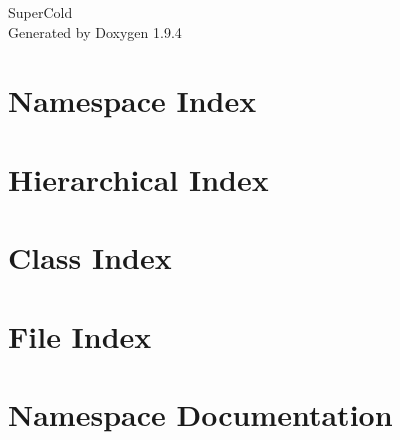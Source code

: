 \documentclass[twoside]{book}
\newcommand{\+}{\discretionary{\mbox{\scriptsize$\hookleftarrow$}}{}{}}
\newcommand{\clearemptydoublepage}{%
    \newpage{\pagestyle{empty}\cleardoublepage}%
  }
\begin{document}
  \raggedbottom
    \hypersetup{pageanchor=false,
                bookmarksnumbered=true,
                pdfencoding=unicode
               }
  \begin{titlepage}
  \vspace*{7cm}
  \begin{center}%
  {\Large Super\+Cold}\\
  \vspace*{1cm}
  {\large Generated by Doxygen 1.9.4}\\
  \end{center}
  \end{titlepage}
  \clearemptydoublepage
  \tableofcontents
  \clearemptydoublepage
  \hypersetup{pageanchor=true}
\chapter{Namespace Index}

\chapter{Hierarchical Index}

\chapter{Class Index}

\chapter{File Index}

\chapter{Namespace Documentation}






\end{document}
